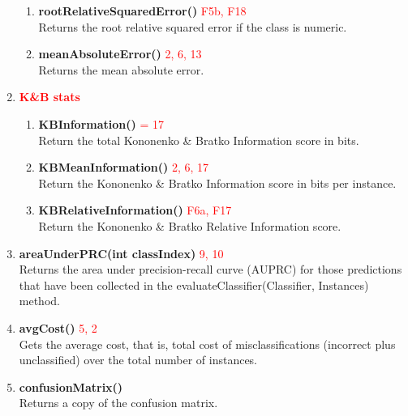 \documentclass[a4paper,12pt]{article}
\begin{document}
\begin{enumerate}
\begin{enumerate}
\item \textbf{rootRelativeSquaredError()} \textcolor{red}{F5b, F18}
         \\ Returns the root relative squared error if the class is numeric. 
                    
\item \textbf{meanAbsoluteError()} \textcolor{red}{2, 6, 13}
        \\  Returns the mean absolute error. 
\end{enumerate}    

\item  \textbf{\textcolor{red}{K\&B stats}}
\begin{enumerate}          
\item \textbf{KBInformation()} \textcolor{red}{ = 17}
         \\ Return the total Kononenko \& Bratko Information score in bits. 
          
\item \textbf{KBMeanInformation()} \textcolor{red}{2, 6, 17}
         \\ Return the Kononenko \& Bratko Information score in bits per instance. 
           
\item \textbf{KBRelativeInformation()} \textcolor{red}{F6a, F17}
        \\  Return the Kononenko \& Bratko Relative Information score.
\end{enumerate}


\item \textbf{areaUnderPRC(int classIndex)} \textcolor{red}{ 9, 10}
        \\  Returns the area under precision-recall curve (AUPRC) for those predictions that have been collected in the evaluateClassifier(Classifier, Instances) method.
          


\item \textbf{avgCost()} \textcolor{red}{5, 2}
         \\ Gets the average cost, that is, total cost of misclassifications (incorrect plus unclassified) over the total number of instances.

\item \textbf{confusionMatrix()}
         \\ Returns a copy of the confusion matrix.
          

          


\end{enumerate}
\end{document}
